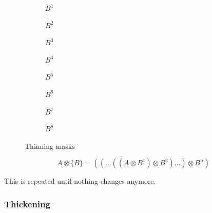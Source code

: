 \begin{figure}[h]
	\centering
	\begin{subfigure}[b]{0.1\textwidth}
		\centering
		\caption{$B^1$}
	\end{subfigure}
	\begin{subfigure}[b]{0.1\textwidth}
		\centering
		\caption{$B^2$}
	\end{subfigure}
	\begin{subfigure}[b]{0.1\textwidth}
		\centering
		\caption{$B^3$}
	\end{subfigure}
	\begin{subfigure}[b]{0.1\textwidth}
		\centering
		\caption{$B^4$}
	\end{subfigure}
	\begin{subfigure}[b]{0.1\textwidth}
		\centering
		\caption{$B^5$}
	\end{subfigure}
	\begin{subfigure}[b]{0.1\textwidth}
		\centering
		\caption{$B^6$}
	\end{subfigure}
	\begin{subfigure}[b]{0.1\textwidth}
		\centering
		\caption{$B^7$}
	\end{subfigure}
	\begin{subfigure}[b]{0.1\textwidth}
		\centering
		\caption{$B^8$}
	\end{subfigure}
	\caption{Thinning masks}
\end{figure}
	\[
		A \otimes  \{B\} = ((\ldots((A \otimes B^{1}) \otimes B^{2})\ldots) \otimes B^{n})
	\]

This is repeated until nothing changes anymore.

\subsubsection{Thickening}

